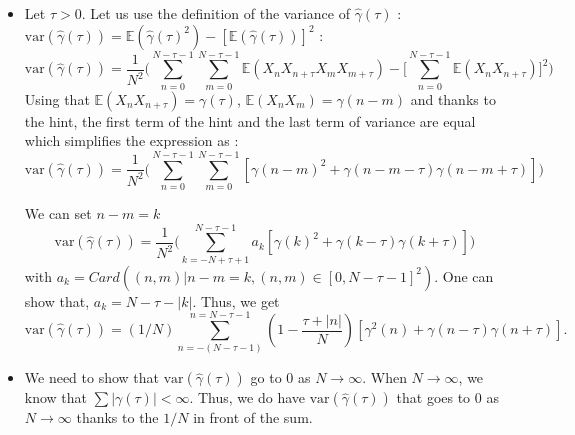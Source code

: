 \documentclass[11pt]{article}
\begin{document}
\begin{solution}
    \begin{itemize}
        \item Let $\tau>0$. Let us use the definition of the variance of $\hat{\gamma}(\tau)$ : $\text{var}(\hat{\gamma}(\tau))=\mathbb{E}(\hat{\gamma}(\tau)^2)-[\mathbb{E}(\hat{\gamma}(\tau))]^2$ :
        \begin{equation}
            \text{var}(\hat{\gamma}(\tau))=\frac{1}{N^2}\bigg(\sum_{n=0}^{N-\tau-1}\sum_{m=0}^{N-\tau-1}\mathbb{E}(X_nX_{n+\tau}X_mX_{m+\tau})-\bigg[\sum_{n=0}^{N-\tau-1}\mathbb{E}(X_nX_{n+\tau})\bigg]^2\bigg)
        \end{equation}
        Using that $\mathbb{E}(X_nX_{n+\tau})=\gamma(\tau)$, $\mathbb{E}(X_nX_m)=\gamma(n-m)$ and thanks to the hint, the first term of the hint and the last term of variance are equal which simplifies the expression as :
        \begin{equation}
            \text{var}(\hat{\gamma}(\tau))=\frac{1}{N^2}\bigg(\sum_{n=0}^{N-\tau-1}\sum_{m=0}^{N-\tau-1}[\gamma(n-m)^2+\gamma(n-m-\tau)\gamma(n-m+\tau)]\bigg)
        \end{equation}
    
        We can set $n-m=k$
        \begin{equation}
            \text{var}(\hat{\gamma}(\tau))=\frac{1}{N^2}\bigg(\sum_{k=-N+\tau+1}^{N-\tau-1}a_k[\gamma(k)^2+\gamma(k-\tau)\gamma(k+\tau)]\bigg)
        \end{equation}
        with $a_k = Card((n,m)|n-m=k,(n,m)\in[0,N-\tau-1]^2)$. One can show that, $a_k = N - \tau - |k|$. Thus, we get
        \begin{equation}
            \text{var}(\hat{\gamma}(\tau)) = (1/N) \sum_{n=-(N-\tau-1)}^{n=N-\tau-1} \left(1 - \frac{\tau + |n|}{N}\right) \left[\gamma^2(n) + \gamma(n-\tau)\gamma(n+\tau)\right].
        \end{equation}
    
        \item We need to show that $\text{var}(\hat{\gamma}(\tau))$ go to 0 as $N\to\infty$. When $N\to\infty$, we know that  $\sum|\gamma(\tau)|<\infty$. Thus, we do have $\text{var}(\hat{\gamma}(\tau))$ that goes to 0 as $N\to\infty$ thanks to the $1/N$ in front of the sum.
    \end{itemize}
\end{solution}
\end{document}
